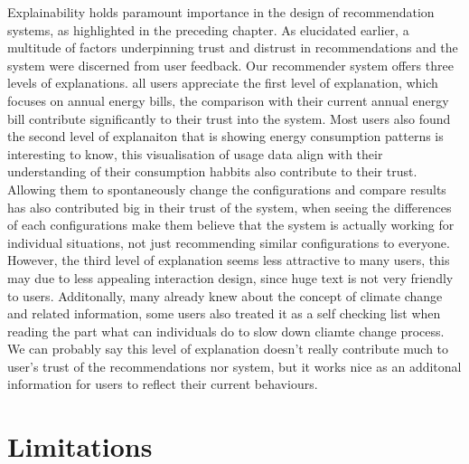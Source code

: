Explainability holds paramount importance in the design of recommendation systems, as highlighted in the preceding chapter. 
As elucidated earlier, a multitude of factors underpinning trust and distrust in recommendations and the system were discerned from user feedback. 
Our recommender system offers three levels of explanations. 
all users appreciate the first level of explanation, which focuses on annual energy bills,
the comparison with their current annual energy bill contribute significantly to their trust into the system.  
Most users also found the second level of explanaiton that is showing energy consumption patterns is interesting to know,
this visualisation of usage data align with their understanding of their consumption habbits also contribute to their trust. 
Allowing them to spontaneously change the configurations and compare results has also contributed big in their trust of the system,
when seeing the differences of each configurations make them believe that the system is actually working for individual situations, not just recommending similar configurations to everyone. 
However, the third level of explanation seems less attractive to many users,
this may due to less appealing interaction design, since huge text is not very friendly to users.
Additonally, many already knew about the concept of climate change and related information, 
some users also treated it as a self checking list when reading the part what can individuals do to slow down cliamte change process. 
We can probably say this level of explanation doesn't really contribute much to user's trust of the recommendations nor system,
but it works nice as an additonal information for users to reflect their current behaviours. 


\section{Limitations}

